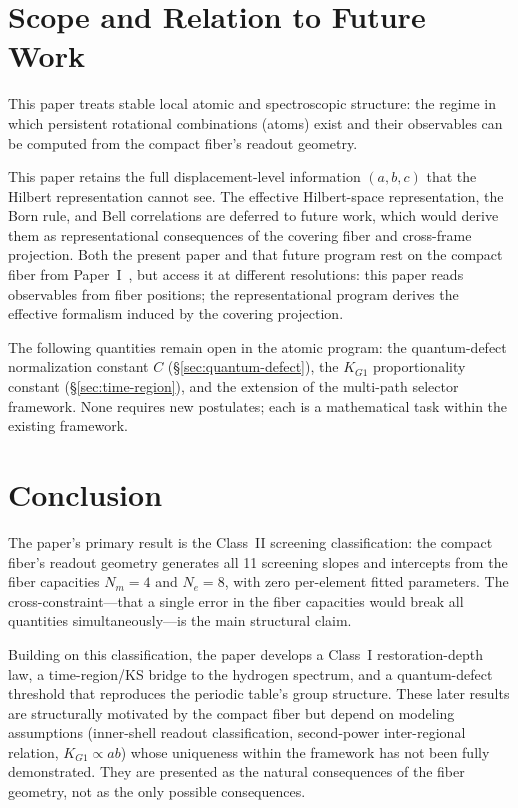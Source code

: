 \documentclass[11pt,a4paper]{article}
\begin{document}
\section{Scope and Relation to Future Work}
\label{sec:scope}

This paper treats stable local atomic and spectroscopic structure: the regime in which persistent rotational combinations (atoms) exist and their observables can be computed from the compact fiber's readout geometry.

This paper retains the full displacement-level information $(a, b, c)$ that the Hilbert representation cannot see. The effective Hilbert-space representation, the Born rule, and Bell correlations are deferred to future work, which would derive them as representational consequences of the covering fiber and cross-frame projection. Both the present paper and that future program rest on the compact fiber from Paper~I~\cite{Wells2026a}, but access it at different resolutions: this paper reads observables from fiber positions; the representational program derives the effective formalism induced by the covering projection.

The following quantities remain open in the atomic program: the quantum-defect normalization constant $C$ (\S\ref{sec:quantum-defect}), the $K_{G1}$ proportionality constant (\S\ref{sec:time-region}), and the extension of the multi-path selector framework. None requires new postulates; each is a mathematical task within the existing framework.

\section{Conclusion}
\label{sec:conclusion}

The paper's primary result is the Class~II screening classification: the compact fiber's readout geometry generates all 11 screening slopes and intercepts from the fiber capacities $N_m = 4$ and $N_e = 8$, with zero per-element fitted parameters. The cross-constraint---that a single error in the fiber capacities would break all quantities simultaneously---is the main structural claim.

Building on this classification, the paper develops a Class~I restoration-depth law, a time-region/KS bridge to the hydrogen spectrum, and a quantum-defect threshold that reproduces the periodic table's group structure. These later results are structurally motivated by the compact fiber but depend on modeling assumptions (inner-shell readout classification, second-power inter-regional relation, $K_{G1} \propto ab$) whose uniqueness within the framework has not been fully demonstrated. They are presented as the natural consequences of the fiber geometry, not as the only possible consequences.
\end{document}
